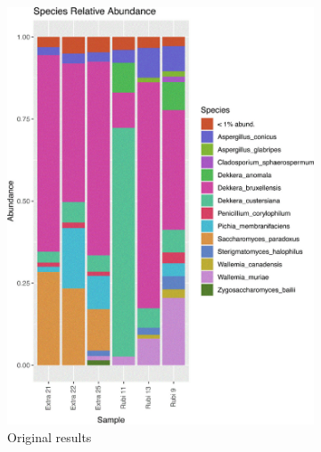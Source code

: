 \begin{figure}[H]
    \centering
    \begin{subfigure}[b]{0.45\textwidth}
        \centering
        \includegraphics[width=\textwidth]{images/orginal_doppelbock_relative_abundence.jpg}
        \caption{Original results}
    \end{subfigure}
    \hfill
    \begin{subfigure}[b]{0.45\textwidth}
        \centering

\end{subfigure}
\end{figure}

